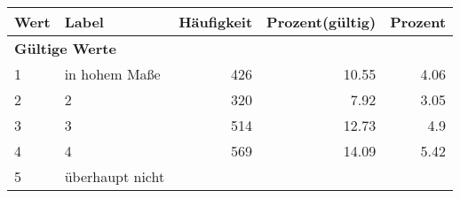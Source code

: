      \begin{longtable}{lXrrr}
     \toprule
     \textbf{Wert} & \textbf{Label} & \textbf{Häufigkeit} & \textbf{Prozent(gültig)} & \textbf{Prozent} \\
     \endhead
     \midrule
     \multicolumn{5}{l}{\textbf{Gültige Werte}}\\

     1 &
     \multicolumn{1}{X}{ in hohem Maße   } &


       \num{426} &
       \num[round-mode=places,round-precision=2]{10,55} &
         \num[round-mode=places,round-precision=2]{4,06} \\

     2 &
     \multicolumn{1}{X}{ 2   } &


       \num{320} &
       \num[round-mode=places,round-precision=2]{7,92} &
         \num[round-mode=places,round-precision=2]{3,05} \\

     3 &
     \multicolumn{1}{X}{ 3   } &


       \num{514} &
       \num[round-mode=places,round-precision=2]{12,73} &
         \num[round-mode=places,round-precision=2]{4,9} \\

     4 &
     \multicolumn{1}{X}{ 4   } &


       \num{569} &
       \num[round-mode=places,round-precision=2]{14,09} &
         \num[round-mode=places,round-precision=2]{5,42} \\

     5 &
     \multicolumn{1}{X}{ überhaupt nicht   } &



\end{longtable}

